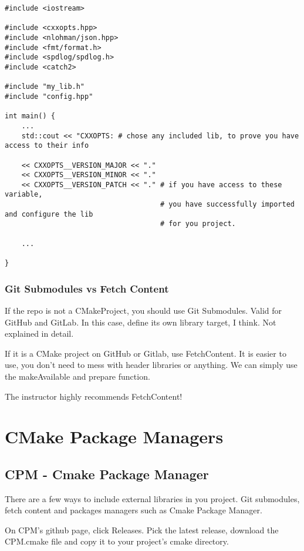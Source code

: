 \documentclass[openany]{report}
\begin{document}
\begin{verbatim}
#include <iostream>

#include <cxxopts.hpp>
#include <nlohman/json.hpp>
#include <fmt/format.h>
#include <spdlog/spdlog.h>
#include <catch2>

#include "my_lib.h"
#include "config.hpp"

int main() {
    ...
    std::cout << "CXXOPTS: # chose any included lib, to prove you have access to their info

    << CXXOPTS__VERSION_MAJOR << "."
    << CXXOPTS__VERSION_MINOR << "."
    << CXXOPTS__VERSION_PATCH << "." # if you have access to these variable, 
                                     # you have successfully imported and configure the lib
                                     # for you project.

    ...

}
\end{verbatim}


\subsection{Git Submodules vs Fetch Content}

If the repo is not a CMakeProject, you should use Git Submodules. Valid for GitHub and GitLab. In this case, 
define its own library target, I think. Not explained in detail.

If it is a CMake project on GitHub or Gitlab, use FetchContent. It is easier to use, you don't need to mess with header
libraries or anything. We can simply use the makeAvailable and prepare function.

The instructor highly recommends FetchContent!


\chapter{CMake Package Managers}

\section{CPM - Cmake Package Manager}

There are a few ways to include external libraries in you project. Git submodules, fetch content and packages managers such as
Cmake Package Manager.

On CPM's github page, click Releases. Pick the latest release, download the CPM.cmake file and copy it to your project's
cmake directory.
\end{document}
